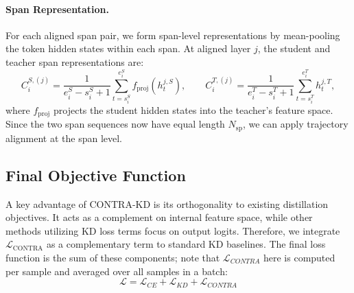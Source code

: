 \documentclass{article} %
\theoremstyle{definition}
\theoremstyle{remark}
\begin{document}
\paragraph{Span Representation.}
For each aligned span pair, we form span-level representations by mean-pooling the token hidden states within each span. At aligned layer $j$, the student and teacher span representations are:
\begin{equation}
    C^{S,(j)}_i = \frac{1}{e^S_i - s^S_i + 1} \sum_{t=s^S_i}^{e^S_i} f_\mathrm{proj}(h^{j,S}_t),
    \qquad
    C^{T,(j)}_i = \frac{1}{e^T_i - s^T_i + 1} \sum_{t=s^T_i}^{e^T_i} h^{j,T}_t,
\end{equation}
where $f_\mathrm{proj}$ projects the student hidden states into the teacher's feature space. Since the two span sequences now have equal length $N_\mathrm{sp}$, we can apply trajectory alignment at the span level.


\subsection{Final Objective Function}
\label{sec:final_loss}
A key advantage of CONTRA-KD is its orthogonality to existing distillation objectives. It acts as a complement on internal feature space, while other methods utilizing KD loss terms focus on output logits. Therefore, we integrate $\mathcal{L}_{\text{CONTRA}}$ as a complementary term to standard KD baselines. The final loss function is the sum of these components; note that $\mathcal{L}_{CONTRA}$ here is computed per sample and averaged over all samples in a batch:
\begin{equation}
\mathcal{L} = \mathcal{L}_{CE} + \mathcal{L}_{KD} + \mathcal{L}_{CONTRA}
\end{equation}
\end{document}

